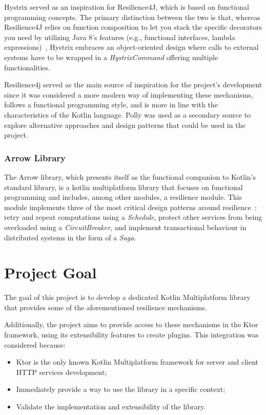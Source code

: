 Hystrix served as an inspiration for Resilience4J, which is based on functional programming concepts.
The primary distinction between the two is that, whereas Resilience4J relies on function composition to let you stack the specific decorators you need by utilizing Java 8's features (e.g., functional interfaces, lambda expressions)~\cite{resilience4j-vs-hystrix}, Hystrix embraces an object-oriented design where calls to external systems have to be wrapped in a \textit{HystrixCommand} offering multiple functionalities.

Resilience4j served as the main source of inspiration for the project's development since it was considered a more modern way of implementing these mechanisms, follows a functional programming style, and is more in line with the characteristics of the Kotlin language.
Polly was used as a secondary source to explore alternative approaches and design patterns that could be used in the project.

\subsubsection{Arrow Library}

The Arrow library,
which presents itself as the functional companion to Kotlin's standard library, is a kotlin multiplatform library that
focuses on functional programming and includes, among other modules, a resilience module.
This module implements three of the most critical design patterns around resilience~\cite{arrow-resilience}:
retry and repeat computations using a \textit{Schedule},
protect other services from being overloaded using a \textit{CircuitBreaker},
and implement transactional behaviour in distributed systems in the form of a \textit{Saga}.


\section{Project Goal}\label{sec:project-goal}

The goal of this project is
to develop a dedicated Kotlin Multiplatform library that provides some of the aforementioned resilience mechanisms.

Additionally, the project aims to provide access to these mechanisms in the Ktor framework, using its extensibility features to create plugins.
This integration was considered because:

\begin{itemize}
    \item Ktor is the only known Kotlin Multiplatform framework for server and client HTTP services development;
    \item Immediately provide a way to use the library in a specific context;
    \item Validate the implementation and extensibility of the library.
\end{itemize}

